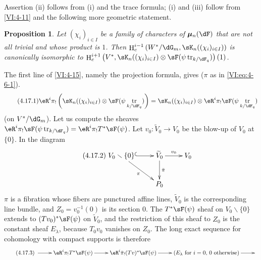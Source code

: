 \documentclass[oneside]{book}
\DeclareMathOperator{\h}{H}
\DeclareMathOperator{\tr}{tr}
\newcommand{\dmu}{{\bm\mu}}
\newcounter{char}
\renewcommand{\setminus}{\smallsetminus}
\theoremstyle{sga-source}
\theoremstyle{sga-source-dash}
\theoremstyle{sga-source-dotdash}
\theoremstyle{sga-source-number-note-dash}
\theoremstyle{sga-source-note-number-dotdash}
\theoremstyle{sga-source-example-dotdash}
\theoremstyle{sga-source-inline-number}
\theoremstyle{sga-source-bare-number}
\theoremstyle{sga-source}
\newtheorem{proposition_}[subsection]{Proposition}
\newcommand{\PrintPage}[1]{}\newcommand{\MathPage}[1]{}\newcommand{\PrintCite}[2]{#1}\newcommand{\var}[3]{#2}
\begin{document}
\PrintPage{205}
Assertion (ii) follows from (i) and the trace formula; (i) and (iii) 
follow from \ref{VI:4-11} and the following more geometric statement. 





\begin{proposition_}\label{VI:4-17}
Let $(\chi_i)_{i\in I}$ be a family of characters of 
$\dmu_n(\dF)$ that are not all trivial and whose product is $1$. Then 
$\h_c^{i-1}\left(W^\ast/\dG_m,\var{\sK_m((\chi_i)_{i\in I})}{\sK_n((\chi_i)_{i\in I})}{S45-SOL-0847}\right)$ is 
canonically isomorphic to 
\newline
$\h_c^{i+1}\left(V^\ast,\var{\sK_m((\chi_i)_{i\in I})}{\sK_n((\chi_i)_{i\in I})}{S45-SOL-0847}\otimes \sF(\psi\tr_{k/\dF_q})\right)(1)$. 
\end{proposition_}

The first line of \ref{VI:4-15}, namely the projection formula, gives ($\pi$ as in 
\eqref{VI:eq:4-6-1}). 
\begin{equation*}\tag{4.17.1}\label{VI:eq:4-17-1}
  \eR^i \pi_!\left(\sK_n((\chi_i)_{i\in I})\otimes \sF(\psi \tr_{k/\dF_q})\right) = \sK_n((\chi_i)_{i\in I}) \otimes \eR^i \pi_! \sF(\psi\tr_{k/\dF_q}) 
\end{equation*}
(on $V^\ast/\dG_m$). Let us compute the sheaves 
$\eR^i\pi_! \sF(\psi\tr_{k/\dF_q}) = \eR^i \pi_! T^\ast \sF(\psi)$. Let 
$v_0:\widetilde V_0 \to V_0$ be the blow-up of $V_0$ at $\{0\}$. In the 
diagram 
\begin{equation*}\tag{4.17.2}\label{VI:eq:4-17-2}
\xymatrix{
  V_0\setminus \{0\} \ar@{^{(}->}[r] \ar[dr]_-\pi 
    & \widetilde V_0 \ar[r]^-{v_0} \ar[d]^-{\bar\pi} 
    & V_0 \\
  & P_0 
}
\end{equation*}
$\pi$ is a fibration whose fibers are punctured affine lines, $\widetilde V_0$ 
is the corresponding line bundle, and $Z_0=v_0^{-1}(0)$ is its section $0$. 
The $T^\ast\sF(\psi)$ sheaf on $V_0\setminus \{0\}$ extends to 
$(T v_0)^\ast \sF(\psi)$ on $\widetilde V_0$, and the restriction of this sheaf 
to $Z_0$ is the constant sheaf $E_\lambda$, because $T_0 v_0$ vanishes on 
$Z_0$. The long exact sequence for cohomology with compact supports is therefore 
\begin{equation*}\tag{4.17.3}\label{VI:eq:4-17-3}
\xymatrix{
  \ar[r] 
    & \eR^i \pi_! T^\ast \sF(\psi) \ar[r] 
    & \eR^i \bar\pi_! (T v)^\ast \sF(\psi) \ar[r] 
    & (E_\lambda\text{ for $i=0$, $0$ otherwise}) \ar[r] 
    & 
}
\end{equation*}
\end{document}
